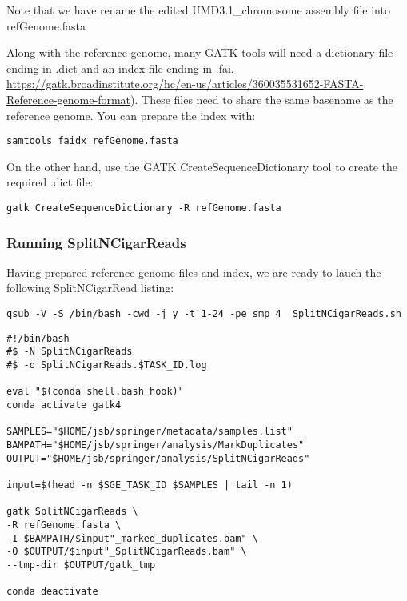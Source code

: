 Note that we have rename the edited UMD3.1\_chromosome assembly file into refGenome.fasta

Along with the reference genome, many GATK tools will need a dictionary file ending in .dict and an index file ending in .fai.\href{https://gatk.broadinstitute.org/hc/en-us/articles/360035531652-FASTA-Reference-genome-format}{ https://gatk.broadinstitute.org/hc/en-us/articles/360035531652-FASTA-Reference-genome-format}). These files need to share the same basename as the reference genome. You can prepare the index with:

\begin{verbatim}
samtools faidx refGenome.fasta
\end{verbatim}

On the other hand, use the GATK CreateSequenceDictionary tool to create the required .dict file:

\begin{verbatim}
gatk CreateSequenceDictionary -R refGenome.fasta
\end{verbatim}




\subsubsection{Running SplitNCigarReads}

Having prepared reference genome files and index, we are ready to lauch the following SplitNCigarRead listing:


\begin{verbatim}
qsub -V -S /bin/bash -cwd -j y -t 1-24 -pe smp 4  SplitNCigarReads.sh
\end{verbatim}



\begin{verbatim}
#!/bin/bash
#$ -N SplitNCigarReads
#$ -o SplitNCigarReads.$TASK_ID.log
	
eval "$(conda shell.bash hook)"
conda activate gatk4
	
SAMPLES="$HOME/jsb/springer/metadata/samples.list"
BAMPATH="$HOME/jsb/springer/analysis/MarkDuplicates"
OUTPUT="$HOME/jsb/springer/analysis/SplitNCigarReads"
	
input=$(head -n $SGE_TASK_ID $SAMPLES | tail -n 1)

gatk SplitNCigarReads \
-R refGenome.fasta \
-I $BAMPATH/$input"_marked_duplicates.bam" \
-O $OUTPUT/$input"_SplitNCigarReads.bam" \
--tmp-dir $OUTPUT/gatk_tmp
	
conda deactivate
\end{verbatim}



